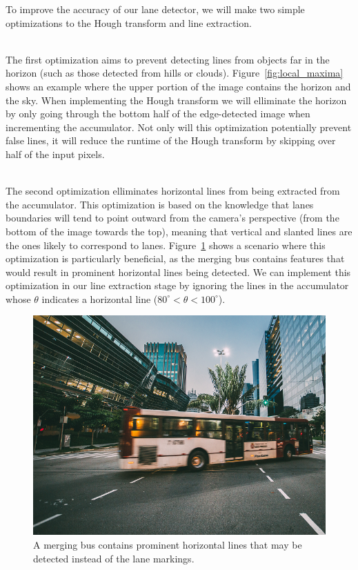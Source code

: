 \documentclass[epsfig,10pt,fullpage]{article}
\begin{document}
To improve the accuracy of our lane detector, we will make two simple optimizations to the Hough transform and
line extraction.

~\\
The first optimization aims to prevent detecting lines from objects far in the horizon (such as those detected from hills or clouds). Figure~\ref{fig:local_maxima} shows an example where the upper portion of the image contains the horizon and
the sky. When implementing the Hough transform we will elliminate the horizon by 
only going through the bottom half of the edge-detected image when incrementing the accumulator.
Not only will this optimization potentially prevent false lines, it will reduce the runtime of the Hough transform by
skipping over half of the input pixels.

~\\
The second optimization elliminates horizontal lines from being extracted from the accumulator. 
This optimization is based on the knowledge that lanes boundaries 
will tend to point outward from the camera's perspective (from the bottom of the image towards the top), 
meaning that vertical and slanted lines are the ones likely to correspond to lanes. 
Figure~\ref{fig:bus} shows a scenario where this optimization is particularly beneficial, as the merging bus contains features
that would result in prominent horizontal lines being detected. 
We can implement this optimization in our line extraction stage by ignoring the lines in the accumulator whose $\theta$
indicates a horizontal line ($80^\circ < \theta < 100^\circ$). 

\begin{figure}[H]
   \begin{center}
       \includegraphics[scale = 0.3]{figures/fig_bus}
   \end{center}
   \caption{A merging bus contains prominent horizontal lines that may be detected instead of the lane markings.}
	\label{fig:bus}
\end{figure}
\end{document}
